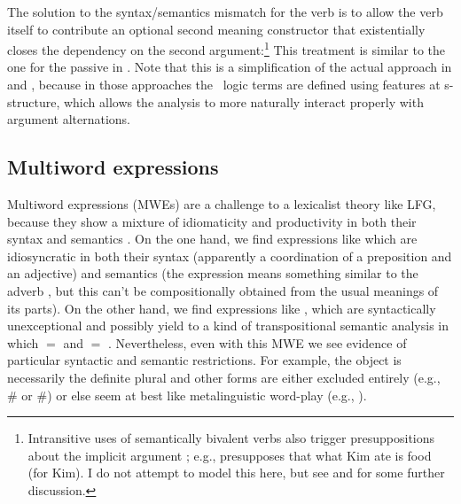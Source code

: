 \documentclass[output=paper,hidelinks]{langscibook}
\begin{document}
The solution to the syntax/semantics mismatch for the verb 
is to allow the verb itself to contribute an optional second meaning
constructor that existentially closes the dependency on the second
argument:\footnote{Intransitive uses of semantically bivalent verbs
  also trigger presuppositions about the implicit argument \citep{fillmore86};
  e.g.,  presupposes that what Kim ate is food
  (for Kim). I do not attempt to model this here, but see
  \citet{AsudGior12} and \citet{asudeh:unrealized} for some further discussion.}
\ea {}
\z
%
This treatment is similar to the one for the passive in
. Note that this is a simplification of the actual
approach in \citet{AsudGior12} and
\citet{asudeh2014meaning}, because in those approaches the \glue\ logic
terms are defined using  features at s-structure,
which allows the analysis to more naturally interact properly with argument
alternations. 


\subsection{Multiword expressions}
\label{sec:mwe}

Multiword expressions (MWEs) are a challenge to a lexicalist theory
like LFG, because they show a mixture of idiomaticity and productivity
in both their syntax and semantics \citep[ch.\,1]{findlay2019}. On the
one hand, we find expressions like  which are
idiosyncratic in both their syntax (apparently a coordination of a
preposition and an adjective) and semantics (the expression means
something similar to the adverb , but this can't be
compositionally obtained from the usual meanings of its parts). On the other
hand, we find expressions like , which are
syntactically unexceptional and possibly yield to a kind of
transpositional semantic analysis in which  $=$
 and  $=$ . Nevertheless, even with this MWE we see evidence of
particular syntactic and semantic restrictions. For example, the
object is necessarily the definite plural  and other forms
are either excluded entirely (e.g., \# or \#) or else seem at best like metalinguistic word-play (e.g.,
).
\end{document}
